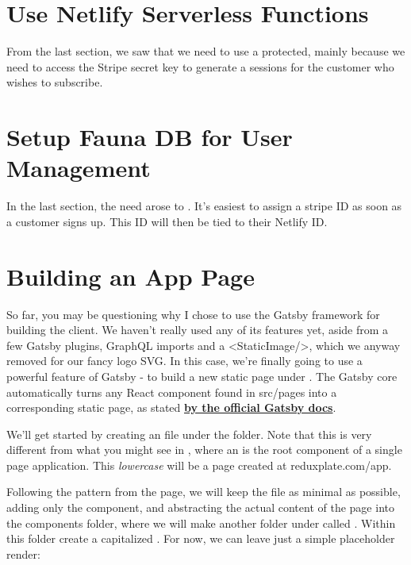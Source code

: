 \documentclass[paper=6in:9in,pagesize=pdftex,headinclude=on,footinclude=on,12pt]{scrbook}
\newcommand{\link}[2]{\textbf{\textcolor{monokaiPink}{\href{#2}{#1}}}}
\begin{document}
\section{Use Netlify Serverless Functions}

From the last section, we saw that we need to use a protected, mainly because we need to access the Stripe secret key to generate a sessions for the customer who wishes to subscribe.

\section{Setup Fauna DB for User Management}

In the last section, the need arose to . It's easiest to assign a stripe ID as soon as a customer signs up. This ID will then be tied to their Netlify ID.

\section{Building an App Page}

So far, you may be questioning why I chose to use the Gatsby framework for building the client. We haven't really used any of its features yet, aside from a few Gatsby plugins, GraphQL imports and a <StaticImage/>, which we anyway removed for our fancy logo SVG. In this case, we're finally going to use a powerful feature of Gatsby - to build a new static page under . The Gatsby core automatically turns any React component found in src/pages into a corresponding static page, as stated \link{by the official Gatsby docs}{https://www.gatsbyjs.com/docs/recipes/pages-layouts/}.


We'll get started by creating an  file under the  folder. Note that this is very different from what you might see in , where an  is the root component of a single page application. This \textit{lowercase}  will be a page created at reduxplate.com/app.

Following the pattern from the  page, we will keep the  file as minimal as possible, adding only the  component, and abstracting the actual content of the page into the components folder, where we will make another folder under  called . Within this folder create a capitalized . For now, we can leave just a simple placeholder render:
\end{document}
